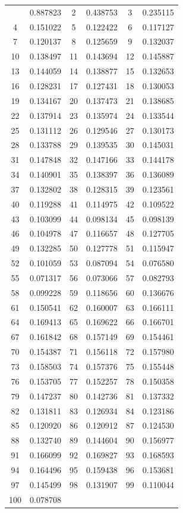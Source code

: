 \documentclass[12pt]{article}
\begin{document}
\begin{longtable}{@{}cc|cc|cc@{}}
\bottomrule
\endlastfoot
1 & 0.887823 & 2 & 0.438753 & 3 & 0.235115 \\
4 & 0.151022 & 5 & 0.122422 & 6 & 0.117127 \\
7 & 0.120137 & 8 & 0.125659 & 9 & 0.132037 \\
10 & 0.138497 & 11 & 0.143694 & 12 & 0.145887 \\
13 & 0.144059 & 14 & 0.138877 & 15 & 0.132653 \\
16 & 0.128231 & 17 & 0.127431 & 18 & 0.130053 \\
19 & 0.134167 & 20 & 0.137473 & 21 & 0.138685 \\
22 & 0.137914 & 23 & 0.135974 & 24 & 0.133544 \\
25 & 0.131112 & 26 & 0.129546 & 27 & 0.130173 \\
28 & 0.133788 & 29 & 0.139535 & 30 & 0.145031 \\
31 & 0.147848 & 32 & 0.147166 & 33 & 0.144178 \\
34 & 0.140901 & 35 & 0.138397 & 36 & 0.136089 \\
37 & 0.132802 & 38 & 0.128315 & 39 & 0.123561 \\
40 & 0.119288 & 41 & 0.114975 & 42 & 0.109522 \\
43 & 0.103099 & 44 & 0.098134 & 45 & 0.098139 \\
46 & 0.104978 & 47 & 0.116657 & 48 & 0.127705 \\
49 & 0.132285 & 50 & 0.127778 & 51 & 0.115947 \\
52 & 0.101059 & 53 & 0.087094 & 54 & 0.076580 \\
55 & 0.071317 & 56 & 0.073066 & 57 & 0.082793 \\
58 & 0.099228 & 59 & 0.118656 & 60 & 0.136676 \\
61 & 0.150541 & 62 & 0.160007 & 63 & 0.166111 \\
64 & 0.169413 & 65 & 0.169622 & 66 & 0.166701 \\
67 & 0.161842 & 68 & 0.157149 & 69 & 0.154461 \\
70 & 0.154387 & 71 & 0.156118 & 72 & 0.157980 \\
73 & 0.158503 & 74 & 0.157376 & 75 & 0.155448 \\
76 & 0.153705 & 77 & 0.152257 & 78 & 0.150358 \\
79 & 0.147237 & 80 & 0.142736 & 81 & 0.137332 \\
82 & 0.131811 & 83 & 0.126934 & 84 & 0.123186 \\
85 & 0.120920 & 86 & 0.120912 & 87 & 0.124530 \\
88 & 0.132740 & 89 & 0.144604 & 90 & 0.156977 \\
91 & 0.166099 & 92 & 0.169827 & 93 & 0.168593 \\
94 & 0.164496 & 95 & 0.159438 & 96 & 0.153681 \\
97 & 0.145499 & 98 & 0.131907 & 99 & 0.110044 \\
100 & 0.078708 &  &  &  &  \\

\end{longtable}
\end{document}
